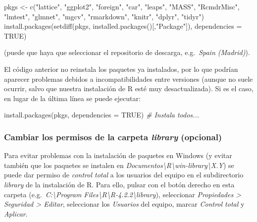 \documentclass[
]{book}
\newenvironment{Shaded}{\begin{snugshade}}{\end{snugshade}}
\newcommand{\AttributeTok}[1]{\textcolor[rgb]{0.77,0.63,0.00}{#1}}
\newcommand{\CommentTok}[1]{\textcolor[rgb]{0.56,0.35,0.01}{\textit{#1}}}
\newcommand{\ConstantTok}[1]{\textcolor[rgb]{0.00,0.00,0.00}{#1}}
\newcommand{\FunctionTok}[1]{\textcolor[rgb]{0.00,0.00,0.00}{#1}}
\newcommand{\NormalTok}[1]{#1}
\newcommand{\OtherTok}[1]{\textcolor[rgb]{0.56,0.35,0.01}{#1}}
\newcommand{\StringTok}[1]{\textcolor[rgb]{0.31,0.60,0.02}{#1}}
\theoremstyle{break}
\theoremstyle{nonumberplain}
\begin{document}
\begin{Shaded}
\begin{Highlighting}[]
\NormalTok{pkgs }\OtherTok{\textless{}{-}} \FunctionTok{c}\NormalTok{(}\StringTok{"lattice"}\NormalTok{, }\StringTok{"ggplot2"}\NormalTok{, }\StringTok{"foreign"}\NormalTok{, }\StringTok{"car"}\NormalTok{, }\StringTok{"leaps"}\NormalTok{, }\StringTok{"MASS"}\NormalTok{, }\StringTok{"RcmdrMisc"}\NormalTok{, }
          \StringTok{"lmtest"}\NormalTok{, }\StringTok{"glmnet"}\NormalTok{, }\StringTok{"mgcv"}\NormalTok{, }\StringTok{"rmarkdown"}\NormalTok{, }\StringTok{"knitr"}\NormalTok{, }\StringTok{"dplyr"}\NormalTok{, }\StringTok{"tidyr"}\NormalTok{)}
\FunctionTok{install.packages}\NormalTok{(}\FunctionTok{setdiff}\NormalTok{(pkgs, }\FunctionTok{installed.packages}\NormalTok{()[,}\StringTok{"Package"}\NormalTok{]), }\AttributeTok{dependencies =} \ConstantTok{TRUE}\NormalTok{)}
\end{Highlighting}
\end{Shaded}

(puede que haya que seleccionar el repositorio de descarga, e.g.~\emph{Spain (Madrid)}).

El código anterior no reinstala los paquetes ya instalados, por lo que podrían aparecer problemas debidos a incompatibilidades entre versiones (aunque no suele ocurrir, salvo que nuestra instalación de R esté muy desactualizada).
Si es el caso, en lugar de la última línea se puede ejecutar:

\begin{Shaded}
\begin{Highlighting}[]
\FunctionTok{install.packages}\NormalTok{(pkgs, }\AttributeTok{dependencies =} \ConstantTok{TRUE}\NormalTok{) }\CommentTok{\# Instala todos...}
\end{Highlighting}
\end{Shaded}

\hypertarget{library}{%
\subsubsection{\texorpdfstring{Cambiar los permisos de la carpeta \emph{library} (opcional)}{Cambiar los permisos de la carpeta library (opcional)}}\label{library}}

Para evitar problemas con la instalación de paquetes en Windows (y evitar también que los paquetes se instalen en \emph{Documentos\textbackslash R\textbackslash win-library\textbackslash X.Y}) se puede dar permiso de \emph{control total} a los usuarios del equipo en el subdirectorio \emph{library} de la instalación de R.
Para ello, pulsar con el botón derecho en esta carpeta (e.g.~\emph{C:\textbackslash Program Files\textbackslash R\textbackslash R-4.2.2\textbackslash library}), seleccionar \emph{Propiedades \textgreater{} Seguridad \textgreater{} Editar}, seleccionar los \emph{Usuarios} del equipo, marcar \emph{Control total} y \emph{Aplicar}.
\end{document}

